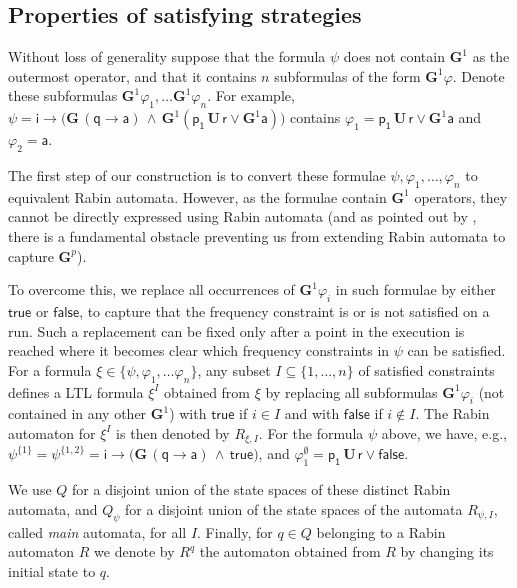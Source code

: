 \documentclass[a4paper,UKenglish]{lipics}
\newcommand{\true}{\mathsf{true}}
\newcommand{\false}{\mathsf{false}}
\newcommand{\Gf}[1]{\mathbf{G}^{#1}}
\newcommand{\G}{\mathbf{G}\,}
\newcommand{\U}{\,\mathbf{U}\,}
\newcommand{\rabin}{R}
\newcommand{\ap}[1]{\ensuremath{\mathsf{#1}}}
\begin{document}
\subsection{Properties of satisfying strategies}
\label{sec:strat}

Without loss of generality suppose that the formula $\psi$ does not contain $\Gf{1}$ as the outermost operator, and that it contains $n$ subformulas of the form $\Gf{1} \varphi$. Denote these subformulas $\Gf{1}\varphi_1,\ldots \Gf{1}\varphi_n$. 
For example, $\psi = \ap{i} \rightarrow \big( \G (\ap{q} \rightarrow \ap{a}) \,\land\, \Gf{1} ( \ap{p_1} \U \ap{r} \lor \Gf{1} \ap{a} ) \big)
$
contains $\varphi_1= \ap{p_1} \U \ap{r} \lor \Gf{1} \ap{a}$ and $\varphi_2 = \ap{a}$.

The first step of our construction is to convert these formulae $\psi, \varphi_1,\ldots,\varphi_n$ to equivalent Rabin automata. However, as the formulae contain $\Gf{1}$ operators, they cannot be directly expressed using Rabin automata (and as pointed out by \cite{AT12}, there is a fundamental obstacle preventing us from extending Rabin automata to capture $\Gf{p}$). 

To overcome this, we replace all occurrences of $\Gf{1}\varphi_i$ in such formulae by either $\true$ or $\false$, to capture that the frequency constraint is or is not satisfied on a run. 
Such a replacement can be fixed only after a point in the execution is reached where it becomes clear which frequency constraints in $\psi$ can be satisfied.
For a formula $\xi\in \{\psi, \varphi_1,\ldots \varphi_n\}$, any subset $I \subseteq \{1, \ldots,n \}$ of satisfied constraints defines a LTL formula $\xi^I$ obtained from 
$\xi$ by replacing all subformulas $\Gf{1}\varphi_i$ (not contained in any other $\Gf{1}$) with $\true$ if $i\in I$ and with $\false$ if $i\not\in I$. The Rabin automaton for $\xi^I$ is then denoted by $\rabin_{\xi,I}$.
For the formula $\psi$ above, we have, e.g.,
$\psi^{\{1\}} = \psi^{\{1,2\}} = \ap{i} \rightarrow \big( \G (\ap{q} \rightarrow \ap{a}) \,\land\, \true \big)$, and $\varphi_1^{\emptyset} = \ap{p_1} \U \ap{r} \lor \false$. 

We use $Q$ for a disjoint union of the state spaces of these distinct Rabin automata, and $Q_\psi$ for a disjoint union of the state spaces of the automata $\rabin_{\psi,I}$, called \emph{main} automata, for all $I$. 
Finally, for $q\in Q$ belonging to a Rabin automaton $\rabin$ we denote by $\rabin^q$ the automaton obtained from $\rabin$ by changing its initial state to $q$.
\end{document}
